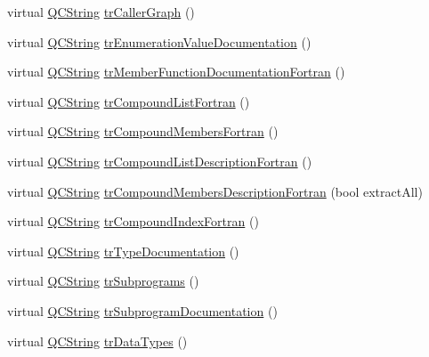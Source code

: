 \begin{DoxyCompactItemize}
virtual \mbox{\hyperlink{class_q_c_string}{Q\+C\+String}} \mbox{\hyperlink{class_translator_portuguese_afb7c39aea2eecd206678561da247d9c8}{tr\+Caller\+Graph}} ()
\item 
virtual \mbox{\hyperlink{class_q_c_string}{Q\+C\+String}} \mbox{\hyperlink{class_translator_portuguese_abc195d606fac92023893842cc4eb04d8}{tr\+Enumeration\+Value\+Documentation}} ()
\item 
virtual \mbox{\hyperlink{class_q_c_string}{Q\+C\+String}} \mbox{\hyperlink{class_translator_portuguese_a235d508ee0e4f9611c5b3e5b562fda74}{tr\+Member\+Function\+Documentation\+Fortran}} ()
\item 
virtual \mbox{\hyperlink{class_q_c_string}{Q\+C\+String}} \mbox{\hyperlink{class_translator_portuguese_a5b6d246dc1df2ca8c62f69594858a4ce}{tr\+Compound\+List\+Fortran}} ()
\item 
virtual \mbox{\hyperlink{class_q_c_string}{Q\+C\+String}} \mbox{\hyperlink{class_translator_portuguese_afac21e3d9033517a4a53923b40241a56}{tr\+Compound\+Members\+Fortran}} ()
\item 
virtual \mbox{\hyperlink{class_q_c_string}{Q\+C\+String}} \mbox{\hyperlink{class_translator_portuguese_a1e8ca72a3baecb7a7de0efea29c1e607}{tr\+Compound\+List\+Description\+Fortran}} ()
\item 
virtual \mbox{\hyperlink{class_q_c_string}{Q\+C\+String}} \mbox{\hyperlink{class_translator_portuguese_a4d41bc71ac5698f2ce1486d2a2f8e74d}{tr\+Compound\+Members\+Description\+Fortran}} (bool extract\+All)
\item 
virtual \mbox{\hyperlink{class_q_c_string}{Q\+C\+String}} \mbox{\hyperlink{class_translator_portuguese_abff94ae8e973957af7d2f3e65ec6cadc}{tr\+Compound\+Index\+Fortran}} ()
\item 
virtual \mbox{\hyperlink{class_q_c_string}{Q\+C\+String}} \mbox{\hyperlink{class_translator_portuguese_ab8c351e04f153f0176618fba500a325c}{tr\+Type\+Documentation}} ()
\item 
virtual \mbox{\hyperlink{class_q_c_string}{Q\+C\+String}} \mbox{\hyperlink{class_translator_portuguese_ae3921a56819b66c9fe81c959828c3238}{tr\+Subprograms}} ()
\item 
virtual \mbox{\hyperlink{class_q_c_string}{Q\+C\+String}} \mbox{\hyperlink{class_translator_portuguese_a84b625f6d42d7cfa631345c400d13ed5}{tr\+Subprogram\+Documentation}} ()
\item 
virtual \mbox{\hyperlink{class_q_c_string}{Q\+C\+String}} \mbox{\hyperlink{class_translator_portuguese_ae093d4bfe038bacb3f4c0313196db34f}{tr\+Data\+Types}} ()

\end{DoxyCompactItemize}
